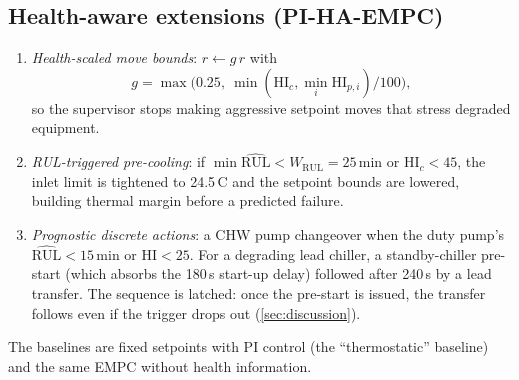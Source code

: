 \documentclass[preprint,12pt,authoryear]{elsarticle}
\begin{document}
\subsection{Health-aware extensions (PI-HA-EMPC)}
\begin{enumerate}
\item \emph{Health-scaled move bounds}: $r\leftarrow g\,r$ with
\[g=\max\bigl(0.25,\ \min(\mathrm{HI}_c,\min_i\mathrm{HI}_{p,i})/100\bigr),\]
so the supervisor stops making aggressive setpoint moves that stress degraded equipment.
\item \emph{RUL-triggered pre-cooling}: if $\min\widehat{\mathrm{RUL}}<W_{\mathrm{RUL}}=25$\,min or $\mathrm{HI}_c<45$, the inlet limit is tightened to 24.5\,\textdegree C and the setpoint bounds are lowered, building thermal margin before a predicted failure.
\item \emph{Prognostic discrete actions}: a CHW pump changeover when the duty pump's $\widehat{\mathrm{RUL}}<15$\,min or $\mathrm{HI}<25$. For a degrading lead chiller, a standby-chiller pre-start (which absorbs the 180\,s start-up delay) followed after 240\,s by a lead transfer. The sequence is latched: once the pre-start is issued, the transfer follows even if the trigger drops out (\cref{sec:discussion}).
\end{enumerate}
The baselines are fixed setpoints with PI control (the ``thermostatic'' baseline) and the same EMPC without health information.

\end{document}
